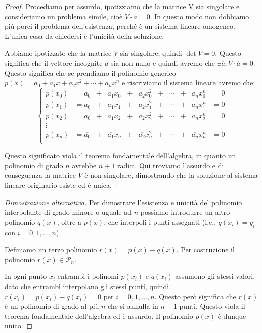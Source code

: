 \documentclass{article}
\theoremstyle{plain}
\theoremstyle{plain}
\theoremstyle{definition}
\theoremstyle{definition}
\begin{document}
\begin{proof}
	Procediamo per assurdo, ipotizziamo che la matrice V sia singolare e consideriamo un problema simile, cioè $V \cdot a=0$. In questo modo non dobbiamo più porci il problema dell'esistenza, perché è un sistema lineare omogeneo. L'unica cosa da chiedersi è l'unicità della soluzione.
	
	Abbiamo ipotizzato che la matrice $V$ sia singolare, quindi $\det V=0$. Questo significa che il vettore incognite $a$ sia non nullo e quindi avremo che $\exists \overline{a} : V \cdot \overline{a}=0$. Questo significa che se prendiamo il polinomio generico $p(x)=\overline{a_{0}} + \overline{a_{1}}x + \overline{a_{2}}x^2 + \cdots + \overline{a_{n}}x^n$ e riscriviamo il sistema lineare avremo che:
	\begin{equation*}
	\left\{
	\begin{alignedat}{6}
		p(x_{0}) & = \overline{a_{0}} & +{} &  \overline{a_{1}}x_{0} & +{} & \overline{a_{2}}x_{0}^2 & +{} & \cdots & +{} & \overline{a_{n}}x_{0}^n & = 0 \\
		p(x_{1}) & = \overline{a_{0}} & +{} &  \overline{a_{1}}x_{1} & +{} & \overline{a_{2}}x_{1}^2 & +{} & \cdots & +{} & \overline{a_{n}}x_{1}^n & = 0 \\
		p(x_{2}) & = \overline{a_{0}} & +{} &  \overline{a_{1}}x_{2} & +{} & \overline{a_{2}}x_{2}^2 & +{} & \cdots & +{} & \overline{a_{n}}x_{2}^n & = 0 \\
		\vdots \\
		p(x_{n}) & = \overline{a_{0}} & +{} &  \overline{a_{1}}x_{n} & +{} & \overline{a_{2}}x_{n}^2 & +{} & \cdots & +{} & \overline{a_{n}}x_{n}^n & = 0 \\
	\end{alignedat}
	\right.
	\end{equation*}
	
	Questo significato viola il teorema fondamentale dell'algebra, in quanto un polinomio di grado $n$ avrebbe $n+1$ radici. Qui troviamo l'assurdo e di conseguenza la matrice $V$ è non singolare, dimostrando che la soluzione al sistema lineare originario esiste ed è unica.
\end{proof}
\begin{proof}[Dimostrazione alternativa]
	Per dimostrare l'esistenza e unicità del polinomio interpolante di grado minore o uguale ad $n$ possiamo introdurre un altro polinomio $q(x)$, oltre a $p(x)$, che interpoli i punti assegnati (i.e., $q(x_{i})=y_{i}$ con $i=0, 1, \dots, n$).
	
	Definiamo un terzo polinomio $r(x)=p(x)-q(x)$. Per costruzione il polinomio $r(x) \in \mathcal{P}_{n}$.
	
	In ogni punto $x_{i}$ entrambi i polinomi $p(x_{i})$ e $q(x_{i})$ assumono gli stessi valori, dato che entrambi interpolano gli stessi punti, quindi $r(x_{i})=p(x_{i})-q(x_{i}) = 0$ per $i=0, 1, \dots, n$. Questo però significa che $r(x)$ è un polinomio di grado al più $n$ che si annulla in $n+1$ punti. Questo viola il teorema fondamentale dell'algebra ed è assurdo. Il polinomio $p(x)$ è dunque unico.
\end{proof}
\end{document}
